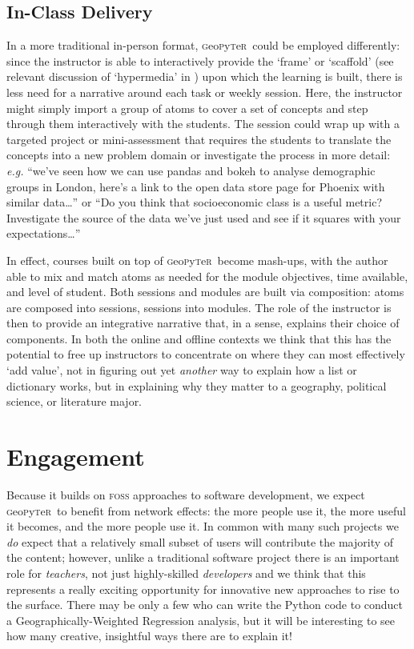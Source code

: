 \documentclass[letter, 11pt]{article}
\newcommand{\gp}{\textsc{g}eo\textsc{p}y\textsc{t}e\textsc{r}~\/}
\begin{document}
\subsection{In-Class Delivery}\label{in-class-delivery}

In a more traditional in-person format, \gp could be employed differently: since the instructor is able to interactively provide the `frame' or `scaffold' (see relevant discussion of `hypermedia' in \citealp{Azevedo2008}) upon which the learning is built, there is less need for a narrative around each task or weekly session. Here, the instructor might simply import a group of atoms to cover a set of concepts and step through them interactively with the students. The session could wrap up with a targeted project or mini-assessment that requires the students to translate the concepts into a new problem domain or investigate the process in more detail: \emph{e.g.} ``we've seen how we can use pandas and bokeh to analyse demographic groups in London, here's a link to the open data store page for Phoenix with similar data\ldots{}'' or ``Do you think that socioeconomic class is a useful metric? Investigate the source of the data we've just used and see if it squares with your expectations\ldots{}''

In effect, courses built on top of \gp become mash-ups, with the author able to mix and match atoms as needed for the module objectives, time available, and level of student. Both sessions and modules are built via composition: atoms are composed into sessions, sessions into modules. The role of the instructor is then to provide an integrative narrative that, in a sense, explains their choice of components. In both the online and offline contexts we think that this has the potential to free up instructors to concentrate on where they can most effectively `add value', not in figuring out yet \emph{another} way to explain how a list or dictionary works, but in explaining why they matter to a geography, political science, or literature major.

\section{Engagement}\label{engagement}

Because it builds on \textsc{foss} approaches to software development, we expect \gp to benefit from network effects: the more people use it, the more useful it becomes, and the more people use it. In common with many such projects we \emph{do} expect that a relatively small subset of users will contribute the majority of the content; however, unlike a traditional software project there is an important role for \emph{teachers}, not just highly-skilled \emph{developers} and we think that this represents a really exciting opportunity for innovative new approaches to rise to the surface. There may be only a few who can write the Python code to conduct a Geographically-Weighted Regression analysis, but it will be interesting to see how many creative, insightful ways there are to explain it!
\end{document}
